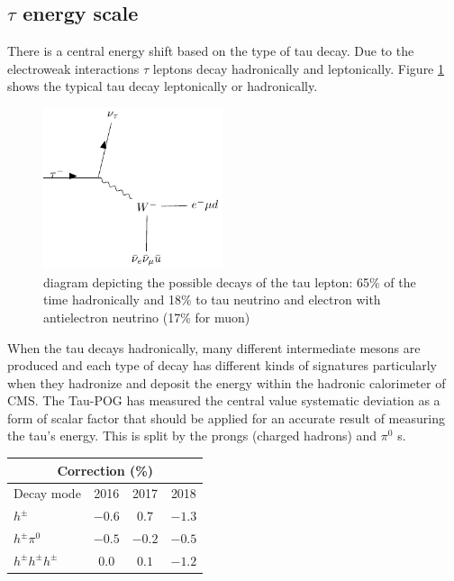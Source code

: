 \subsection{$\tau$ energy scale}
There is a central energy shift based on the type of tau decay. Due to the electroweak interactions $\tau$ leptons decay hadronically and leptonically. Figure \ref{fig:taudecay} shows the typical tau decay leptonically or hadronically.  \\

\begin{figure}[ht!b]
\begin{center}
  \includegraphics[width=0.47\textwidth]{"Figures/taudecay.pdf"}
    \caption{\label{fig:taudecay} diagram depicting the possible decays of the tau lepton: 65\% of the time hadronically and 18\% to tau neutrino and electron with antielectron neutrino (17\% for muon)}
\end{center}
\end{figure} 
When the tau decays hadronically, many different intermediate mesons are produced and each type of decay has different kinds of signatures particularly when they hadronize and deposit the energy within the hadronic calorimeter of CMS. The Tau-POG has measured the central value systematic deviation as a form of scalar factor that should be applied for an accurate result of measuring the tau's energy. This is split by the prongs (charged hadrons) and $\pi^0$ s.  

\begin{table}[h]
  \begin{center}
    \label{tab:TES}
    \begin{tabular} { l | c  c  c }
      \hline \multicolumn{4}{c}{Correction (\%)} \\
      \hline Decay mode & 2016 & 2017 & 2018 \\ \hline
      $h^{\pm}$ & $-0.6$ & $0.7$ & $-1.3$  \\ 
      $h^{\pm}\pi^{0}$ & $-0.5$ & $-0.2$ & $-0.5$  \\ 
      $h^{\pm}h^{\pm}h^{\pm}$ & $0.0$ & $0.1$ & $-1.2$ \\ 
    \end{tabular}
  \end{center}
\end{table}

